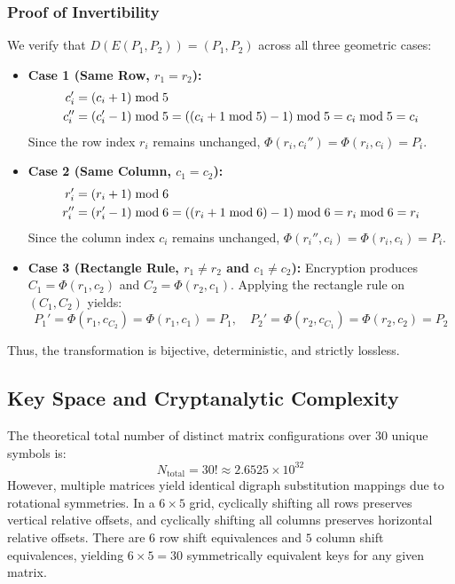 \documentclass{labreport}
\begin{document}
\subsubsection{Proof of Invertibility}
We verify that $D(E(P_1, P_2)) = (P_1, P_2)$ across all three geometric cases:
\begin{itemize}
    \item \textbf{Case 1 (Same Row, $r_1 = r_2$):}
    \begin{align}
    c_i' &= (c_i + 1) \bmod 5 \notag \\
    c_i'' &= (c_i' - 1) \bmod 5 = ((c_i + 1 \bmod 5) - 1) \bmod 5 = c_i \bmod 5 = c_i
    \end{align}
    Since the row index $r_i$ remains unchanged, $\Phi(r_i, c_i'') = \Phi(r_i, c_i) = P_i$.
    \item \textbf{Case 2 (Same Column, $c_1 = c_2$):}
    \begin{align}
    r_i' &= (r_i + 1) \bmod 6 \notag \\
    r_i'' &= (r_i' - 1) \bmod 6 = ((r_i + 1 \bmod 6) - 1) \bmod 6 = r_i \bmod 6 = r_i
    \end{align}
    Since the column index $c_i$ remains unchanged, $\Phi(r_i'', c_i) = \Phi(r_i, c_i) = P_i$.
    \item \textbf{Case 3 (Rectangle Rule, $r_1 \ne r_2$ and $c_1 \ne c_2$):}
    Encryption produces $C_1 = \Phi(r_1, c_2)$ and $C_2 = \Phi(r_2, c_1)$. Applying the rectangle rule on $(C_1, C_2)$ yields:
    \begin{equation}
    P_1' = \Phi(r_1, c_{C_2}) = \Phi(r_1, c_1) = P_1, \quad P_2' = \Phi(r_2, c_{C_1}) = \Phi(r_2, c_2) = P_2
    \end{equation}
\end{itemize}
Thus, the transformation is bijective, deterministic, and strictly lossless.

\subsection{Key Space and Cryptanalytic Complexity}
The theoretical total number of distinct matrix configurations over 30 unique symbols is:
\begin{equation}
N_{\text{total}} = 30! \approx 2.6525 \times 10^{32}
\end{equation}
However, multiple matrices yield identical digraph substitution mappings due to rotational symmetries. In a $6 \times 5$ grid, cyclically shifting all rows preserves vertical relative offsets, and cyclically shifting all columns preserves horizontal relative offsets. There are $6$ row shift equivalences and $5$ column shift equivalences, yielding $6 \times 5 = 30$ symmetrically equivalent keys for any given matrix.
\end{document}
